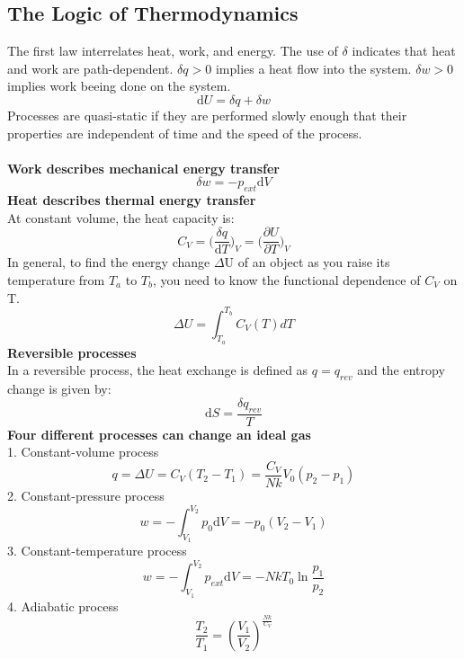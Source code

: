 \documentclass[8pt]{article}
\numberwithin{equation}{section}
\begin{document}
\begin{multicols}{2}
\section{The Logic of Thermodynamics}
The first law interrelates heat, work, and energy. The use of $\delta$ indicates that heat and work are path-dependent. $\delta q > 0$ implies a heat flow into the system. $\delta w > 0$ implies work beeing done on the system. 
\begin{equation}
\mathrm{d}U=\delta q+\delta w \tag{7.1}
\end{equation}
Processes are quasi-static if they are performed slowly enough that their properties are independent of time and the speed of the process. \\\\
\textbf{Work describes mechanical energy transfer} 
\begin{equation}
\delta w = -p_{ext}\mathrm{d}V \tag{7.2}
\end{equation}
\textbf{Heat describes thermal energy transfer} \\ At constant volume, the heat capacity is: 
\begin{equation}
C_V=\bigg( \frac{\delta q}{\mathrm{d} T} \bigg)_{V}=\bigg(\frac{\partial U}{\partial T} \bigg)_{V} \tag{7.3}
\end{equation}
In general, to find the energy change $\Delta$U of an object as you raise its temperature from $T_{a}$ to $T_{b}$, you need to know the functional dependence of $C_{V}$ on T. 
\begin{equation}
\Delta U = \int_{T_{a}}^{T_{b}} C_{V}(T) dT \tag{7.4}
\end{equation}
\textbf{Reversible processes} \\
In a reversible process, the heat exchange is defined as $q=q_{rev}$ and the entropy change is given by: 
\begin{equation}
\mathrm{d}S=\frac{\delta q_{rev}}{T} \tag{7.8}
\end{equation}
\textbf{Four different processes can change an ideal gas} \\
1. Constant-volume process 
\begin{equation}
q=\Delta U=C_{V}(T_{2}-T_{1})=\frac{C_{V}}{Nk}V_{0}(p_{2}-p_{1}) \tag{7.11}
\end{equation}
2. Constant-pressure process 
\begin{equation}
w=-\int_{V_{1}}^{V_{2}} p_{0}\mathrm{d}V=-p_{0}(V_{2}-V_{1}) \tag{7.12}
\end{equation}
3. Constant-temperature process 
\begin{equation}
w=-\int_{V_{1}}^{V_{2}} p_{ext}\mathrm{d}V=-NkT_{0}\ln{\frac{p_{1}}{p_{2}}} \tag{7.15}
\end{equation}
4. Adiabatic process 
\begin{equation}
\frac{T_{2}}{T_{1}}=(\frac{V_{1}}{V_{2}})^{\frac{Nk}{C_{V}}} \tag{7.21}
\end{equation}
\pagebreak

\end{multicols}
\end{document}
